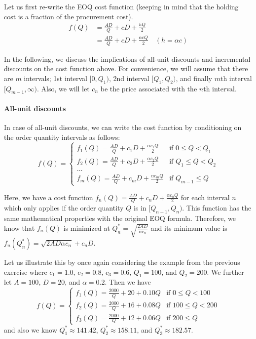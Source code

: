 \begin{solution}
Let us first re-write the EOQ cost function (keeping in mind that the holding cost is a fraction of the procurement cost). 
\begin{align*}
f(Q) 
& = \frac{AD}{Q} + cD + \frac{hQ}{2} \\
& = \frac{AD}{Q} + cD + \frac{\alpha cQ}{2} \quad (h = \alpha c) 
\end{align*}

In the following, we discuss the implications of all-unit discounts and incremental discounts on the cost function above. For convenience, we will assume that there are $m$ intervals; 1st interval $[0,Q_1)$, 2nd interval $[Q_1,Q_2)$, and finally $m$th interval $[Q_{m-1},\infty)$. Also, we will let $c_n$ be the price associated with the $n$th interval. 

\paragraph{All-unit discounts}

In case of all-unit discounts, we can write the cost function by conditioning on the order quantity intervals as follows:
\begin{equation*}
f(Q) = 
\begin{cases}
f_1(Q) = \frac{AD}{Q} + c_1D + \frac{\alpha c_1 Q}{2} & \text{if } 0 \leq Q < Q_1 \\
f_2(Q) = \frac{AD}{Q} + c_2D + \frac{\alpha c_2 Q}{2} & \text{if } Q_1 \leq Q < Q_2 \\
\ldots \\
f_m(Q) = \frac{AD}{Q} + c_mD + \frac{\alpha c_m Q}{2} & \text{if } Q_{m-1} \leq Q 
\end{cases}
\end{equation*}

Here, we have a cost function $f_n(Q) = \frac{AD}{Q} + c_nD + \frac{\alpha c_n Q}{2}$ for each interval $n$ which only applies if the order quantity $Q$ is in $[Q_{n-1},Q_n)$. This function has the same mathematical properties with the original EOQ formula. Therefore, we know that $f_n(Q)$ is minimized at $Q^*_n=\sqrt{\frac{2AD}{\alpha c_n}}$ and its minimum value is $f_n(Q^*_n)=\sqrt{2AD\alpha c_n}+c_n D$.

Let us illustrate this by once again considering the example from the previous exercise where $c_1=1.0$, $c_2=0.8$, $c_3=0.6$, $Q_1=100$, and $Q_2=200$. We further let $A=100$, $D=20$, and $\alpha=0.2$. Then we have 
\begin{equation*}
f(Q) = 
\begin{cases}
f_1(Q) = \frac{2000}{Q} + 20 + 0.10 Q & \text{if } 0 \leq Q < 100 \\
f_2(Q) = \frac{2000}{Q} + 16 + 0.08 Q & \text{if } 100 \leq Q < 200 \\
f_3(Q) = \frac{2000}{Q} + 12 + 0.06 Q & \text{if } 200 \leq Q 
\end{cases}
\end{equation*}
and also we know $Q^*_1\approx 141.42$, $Q^*_2\approx 158.11$, and $Q^*_3\approx 182.57$. 


\end{solution}
